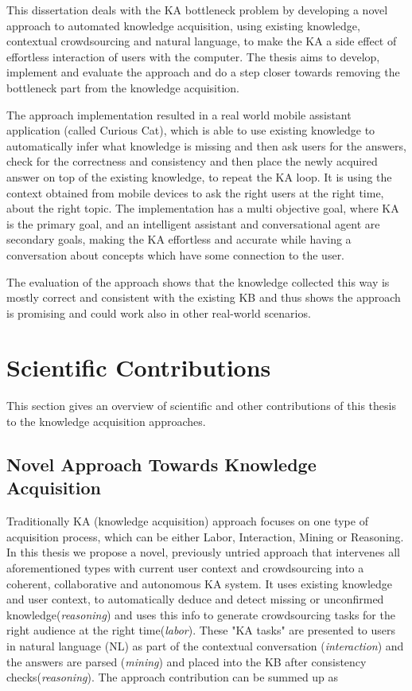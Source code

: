 This dissertation deals with the KA bottleneck problem by developing a novel
approach to automated knowledge acquisition, using existing knowledge,
contextual crowdsourcing and natural language, to make the KA a side effect of
effortless interaction of users with the computer. The thesis aims to develop,
implement and evaluate the approach and do a step closer towards removing the
bottleneck part from the knowledge acquisition.

The approach implementation resulted in a real world mobile assistant 
application (called Curious Cat), which is able to use existing knowledge to 
automatically infer 
what knowledge is missing and then ask users for the answers, check for
the correctness and consistency and then place the newly acquired answer on
top of the existing knowledge, to repeat the KA loop. It is
using the context obtained from mobile devices to ask the right users at the 
right time, about the right topic. 
The implementation has a multi objective goal, 
where KA is the primary goal, and an intelligent assistant and conversational 
agent are secondary goals, making the KA effortless and accurate while having a 
conversation about concepts which have some connection to the user.

The evaluation of the approach shows that the knowledge collected this way is
mostly correct and consistent with the existing KB and thus shows the approach
is promising and could work also in other real-world scenarios.

\section{Scientific Contributions}
This section gives an overview of scientific and other contributions of this 
thesis to the knowledge acquisition approaches.

\subsection{Novel Approach Towards Knowledge Acquisition}
Traditionally KA (knowledge acquisition) approach focuses on one type of 
acquisition process, which can be either Labor, Interaction, Mining or 
Reasoning\parencite{Zang2013}. In this thesis we propose a novel, previously 
untried approach that intervenes all aforementioned types with current user 
context and crowdsourcing into a coherent, collaborative and autonomous 
KA system. It uses existing knowledge and user context, to automatically 
deduce and detect missing or unconfirmed knowledge(\emph{reasoning}) and uses 
this info to generate crowdsourcing tasks for the right audience at the right 
time(\emph{labor}). These "KA tasks" are presented to users in natural language
(NL) as part of the contextual conversation (\emph{interaction}) and the 
answers are parsed (\emph{mining}) and placed into the KB after consistency 
checks(\emph{reasoning}). The approach contribution can be summed up as

